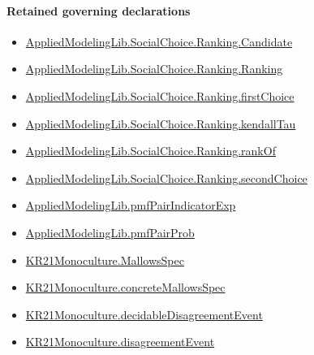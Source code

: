 \documentclass[10pt]{article}
\begin{document}
\paragraph{Retained governing declarations}
\begin{itemize}\raggedright
\item \hyperlink{library-prerequisite-8c0e6c25845ae78a}{Applied\allowbreak{}Modeling\allowbreak{}Lib.\allowbreak{}Social\allowbreak{}Choice.\allowbreak{}Ranking.\allowbreak{}Candidate}
\item \hyperlink{library-prerequisite-5cde54446d1ae021}{Applied\allowbreak{}Modeling\allowbreak{}Lib.\allowbreak{}Social\allowbreak{}Choice.\allowbreak{}Ranking.\allowbreak{}Ranking}
\item \hyperlink{governing-declaration-08e457479ee6cf15}{Applied\allowbreak{}Modeling\allowbreak{}Lib.\allowbreak{}Social\allowbreak{}Choice.\allowbreak{}Ranking.\allowbreak{}first\allowbreak{}Choice}
\item \hyperlink{governing-declaration-127efd44d176e2ba}{Applied\allowbreak{}Modeling\allowbreak{}Lib.\allowbreak{}Social\allowbreak{}Choice.\allowbreak{}Ranking.\allowbreak{}kendall\allowbreak{}Tau}
\item \hyperlink{governing-declaration-ef804e95c0f14f7c}{Applied\allowbreak{}Modeling\allowbreak{}Lib.\allowbreak{}Social\allowbreak{}Choice.\allowbreak{}Ranking.\allowbreak{}rank\allowbreak{}Of}
\item \hyperlink{governing-declaration-25ac37baf58f31e2}{Applied\allowbreak{}Modeling\allowbreak{}Lib.\allowbreak{}Social\allowbreak{}Choice.\allowbreak{}Ranking.\allowbreak{}second\allowbreak{}Choice}
\item \hyperlink{governing-declaration-7bfbb69dcda546c7}{Applied\allowbreak{}Modeling\allowbreak{}Lib.\allowbreak{}pmf\allowbreak{}Pair\allowbreak{}Indicator\allowbreak{}Exp}
\item \hyperlink{governing-declaration-a60793d10cbad53d}{Applied\allowbreak{}Modeling\allowbreak{}Lib.\allowbreak{}pmf\allowbreak{}Pair\allowbreak{}Prob}
\item \hyperlink{governing-declaration-b2e6ec0602659b07}{KR21\allowbreak{}Monoculture.\allowbreak{}Mallows\allowbreak{}Spec}
\item \hyperlink{governing-declaration-0e399c7dd166853c}{KR21\allowbreak{}Monoculture.\allowbreak{}concrete\allowbreak{}Mallows\allowbreak{}Spec}
\item \hyperlink{governing-declaration-5cbdecfd9d92e1c7}{KR21\allowbreak{}Monoculture.\allowbreak{}decidable\allowbreak{}Disagreement\allowbreak{}Event}
\item \hyperlink{governing-declaration-2d73a8643b1237e4}{KR21\allowbreak{}Monoculture.\allowbreak{}disagreement\allowbreak{}Event}
\end{itemize}
\end{document}
